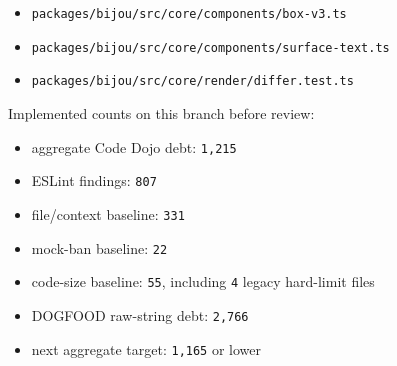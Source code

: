 \begin{itemize}
\item
  \texttt{p\allowbreak{}a\allowbreak{}c\allowbreak{}k\allowbreak{}a\allowbreak{}g\allowbreak{}e\allowbreak{}s\allowbreak{}/\allowbreak{}b\allowbreak{}i\allowbreak{}j\allowbreak{}o\allowbreak{}u\allowbreak{}/\allowbreak{}s\allowbreak{}r\allowbreak{}c\allowbreak{}/\allowbreak{}c\allowbreak{}o\allowbreak{}r\allowbreak{}e\allowbreak{}/\allowbreak{}c\allowbreak{}o\allowbreak{}m\allowbreak{}p\allowbreak{}o\allowbreak{}n\allowbreak{}e\allowbreak{}n\allowbreak{}t\allowbreak{}s\allowbreak{}/\allowbreak{}b\allowbreak{}o\allowbreak{}x\allowbreak{}-\allowbreak{}v\allowbreak{}3\allowbreak{}.\allowbreak{}t\allowbreak{}s}
\item
  \texttt{p\allowbreak{}a\allowbreak{}c\allowbreak{}k\allowbreak{}a\allowbreak{}g\allowbreak{}e\allowbreak{}s\allowbreak{}/\allowbreak{}b\allowbreak{}i\allowbreak{}j\allowbreak{}o\allowbreak{}u\allowbreak{}/\allowbreak{}s\allowbreak{}r\allowbreak{}c\allowbreak{}/\allowbreak{}c\allowbreak{}o\allowbreak{}r\allowbreak{}e\allowbreak{}/\allowbreak{}c\allowbreak{}o\allowbreak{}m\allowbreak{}p\allowbreak{}o\allowbreak{}n\allowbreak{}e\allowbreak{}n\allowbreak{}t\allowbreak{}s\allowbreak{}/\allowbreak{}s\allowbreak{}u\allowbreak{}r\allowbreak{}f\allowbreak{}a\allowbreak{}c\allowbreak{}e\allowbreak{}-\allowbreak{}t\allowbreak{}e\allowbreak{}x\allowbreak{}t\allowbreak{}.\allowbreak{}t\allowbreak{}s}
\item
  \texttt{p\allowbreak{}a\allowbreak{}c\allowbreak{}k\allowbreak{}a\allowbreak{}g\allowbreak{}e\allowbreak{}s\allowbreak{}/\allowbreak{}b\allowbreak{}i\allowbreak{}j\allowbreak{}o\allowbreak{}u\allowbreak{}/\allowbreak{}s\allowbreak{}r\allowbreak{}c\allowbreak{}/\allowbreak{}c\allowbreak{}o\allowbreak{}r\allowbreak{}e\allowbreak{}/\allowbreak{}r\allowbreak{}e\allowbreak{}n\allowbreak{}d\allowbreak{}e\allowbreak{}r\allowbreak{}/\allowbreak{}d\allowbreak{}i\allowbreak{}f\allowbreak{}f\allowbreak{}e\allowbreak{}r\allowbreak{}.\allowbreak{}t\allowbreak{}e\allowbreak{}s\allowbreak{}t\allowbreak{}.\allowbreak{}t\allowbreak{}s}
\end{itemize}

Implemented counts on this branch before review:

\begin{itemize}
\tightlist
\item
  aggregate Code Dojo debt: \texttt{1\allowbreak{},\allowbreak{}2\allowbreak{}1\allowbreak{}5}
\item
  ESLint findings: \texttt{8\allowbreak{}0\allowbreak{}7}
\item
  file/context baseline: \texttt{3\allowbreak{}3\allowbreak{}1}
\item
  mock-ban baseline: \texttt{2\allowbreak{}2}
\item
  code-size baseline: \texttt{5\allowbreak{}5}, including \texttt{4} legacy hard-limit files
\item
  DOGFOOD raw-string debt: \texttt{2\allowbreak{},\allowbreak{}7\allowbreak{}6\allowbreak{}6}
\item
  next aggregate target: \texttt{1\allowbreak{},\allowbreak{}1\allowbreak{}6\allowbreak{}5} or lower
\end{itemize}

